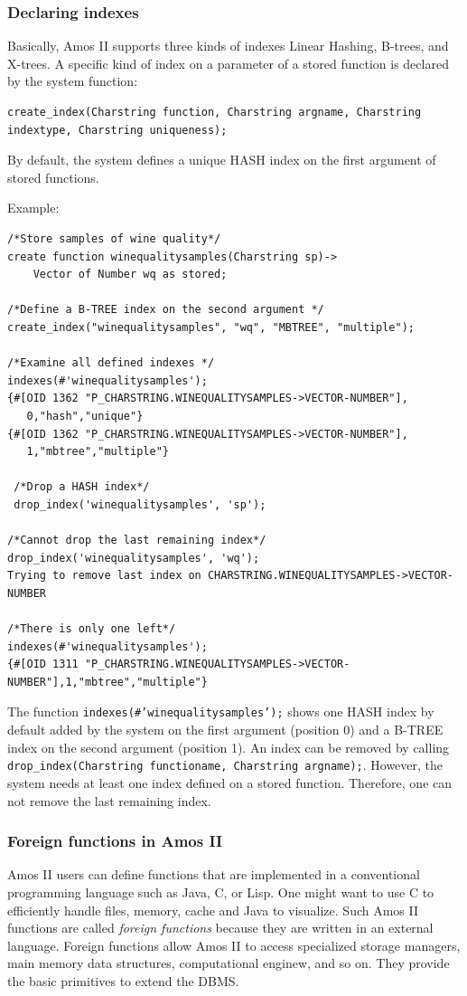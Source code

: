 \documentclass[12pt]{article}
\begin{document}
\subsubsection{Declaring indexes}
Basically, Amos II supports three kinds of indexes Linear Hashing,
B-trees, and X-trees. A specific kind of index on a parameter of a
stored function is declared by the system function:
\begin{lstlisting}[caption=Signature of AMOSQL function create\_index]
create_index(Charstring function, Charstring argname, Charstring indextype, Charstring uniqueness);
\end{lstlisting}
By default, the system defines a unique HASH index on the first
argument of stored functions.

Example:
\begin{lstlisting}[caption=Indexes on a stored function]
/*Store samples of wine quality*/
create function winequalitysamples(Charstring sp)->
	Vector of Number wq as stored;

/*Define a B-TREE index on the second argument */
create_index("winequalitysamples", "wq", "MBTREE", "multiple");

/*Examine all defined indexes */
indexes(#'winequalitysamples');
{#[OID 1362 "P_CHARSTRING.WINEQUALITYSAMPLES->VECTOR-NUMBER"],
   0,"hash","unique"}
{#[OID 1362 "P_CHARSTRING.WINEQUALITYSAMPLES->VECTOR-NUMBER"],
   1,"mbtree","multiple"}

 /*Drop a HASH index*/
 drop_index('winequalitysamples', 'sp');

/*Cannot drop the last remaining index*/
drop_index('winequalitysamples', 'wq');
Trying to remove last index on CHARSTRING.WINEQUALITYSAMPLES->VECTOR-NUMBER

/*There is only one left*/
indexes(#'winequalitysamples');
{#[OID 1311 "P_CHARSTRING.WINEQUALITYSAMPLES->VECTOR-NUMBER"],1,"mbtree","multiple"}
\end{lstlisting}

The function \texttt{indexes(\#'winequalitysamples');} shows one HASH
index by default added by the system on the first argument (position
0) and a B-TREE index on the second argument (position 1). An index
can be removed by calling
\texttt{drop\_index(Charstring functioname, Charstring
argname);}. However, the system needs at least one index defined on a
stored function. Therefore, one can not remove the last remaining
index.

\subsubsection{Foreign functions in Amos II}
Amos II users can define functions that are implemented in a
conventional programming language such as Java, C, or Lisp. One might
want to use C to efficiently handle files, memory, cache and Java to
visualize. Such Amos II functions are called \emph{foreign functions}
because they are written in an external language. Foreign functions
allow Amos II to access specialized storage managers, main memory data
structures, computational enginew, and so on. They provide the basic
primitives to extend the DBMS.
\end{document}
